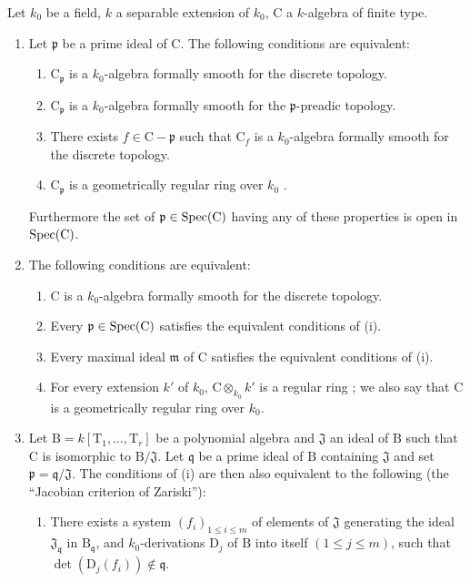 \begin{proposition}[22.6.7]
\label{0.22.6.7}
Let $k_0$ be a field, $k$ a separable extension of $k_0$, $\mathrm{C}$ a $k$-algebra of finite type.
\begin{enumerate}
  \item[\rm{(i)}] Let $\mathfrak{p}$ be a prime ideal of $\mathrm{C}$.
  The following conditions are equivalent:
  \begin{enumerate}
    \item[a)] $\mathrm{C}_\mathfrak{p}$ is a $k_0$-algebra formally smooth for the discrete topology.
    \item[b)] $\mathrm{C}_\mathfrak{p}$ is a $k_0$-algebra formally smooth for the $\mathfrak{p}$-preadic topology.
    \item[c)] There exists $f\in\mathrm{C}-\mathfrak{p}$ such that $\mathrm{C}_f$ is a $k_0$-algebra formally smooth for the discrete topology.
    \item[d)] $\mathrm{C}_\mathfrak{p}$ is a geometrically regular ring over $k_0$ .
  \end{enumerate}
  Furthermore the set of $\mathfrak{p}\in\operatorname{Spec}(\mathrm{C})$ having any of these properties is open in $\operatorname{Spec}(\mathrm{C})$.
  \item[\rm{(ii)}] The following conditions are equivalent:
  \begin{enumerate}
    \item[a)] $\mathrm{C}$ is a $k_0$-algebra formally smooth for the discrete topology.
    \item[b)] Every $\mathfrak{p}\in\operatorname{Spec}(\mathrm{C})$ satisfies the equivalent conditions of (i).
    \item[c)] Every maximal ideal $\mathfrak{m}$ of $\mathrm{C}$ satisfies the equivalent conditions of (i).
    \item[d)] For every extension $k'$ of $k_0$, $\mathrm{C}\otimes_{k_0}k'$ is a regular ring ; we also say that $\mathrm{C}$ is a geometrically regular ring over $k_0$.
  \end{enumerate}


  \item[\rm{(iii)}] Let
  $\mathrm{B}=k[\mathrm{T}_1,\ldots,\mathrm{T}_r]$ be a polynomial algebra and
  $\mathfrak{J}$ an ideal of $\mathrm{B}$ such that $\mathrm{C}$ is
  isomorphic to $\mathrm{B}/\mathfrak{J}$. Let $\mathfrak{q}$ be a prime
  ideal of $\mathrm{B}$ containing $\mathfrak{J}$ and set
  $\mathfrak{p}=\mathfrak{q}/\mathfrak{J}$. The conditions of (i) are then
  also equivalent to the following (the ``Jacobian criterion of Zariski''):
  \begin{enumerate}
    \item[e)] There exists a system $(f_i)_{1\leq i\leq m}$ of elements of
    $\mathfrak{J}$ generating the ideal $\mathfrak{J}_\mathfrak{q}$ in
    $\mathrm{B}_\mathfrak{q}$, and $k_0$-derivations $\mathrm{D}_j$ of
    $\mathrm{B}$ into itself $(1\leq j\leq m)$, such that
    $\det(\mathrm{D}_j(f_i))\notin\mathfrak{q}$.
  \end{enumerate}
\end{enumerate}
\end{proposition}

